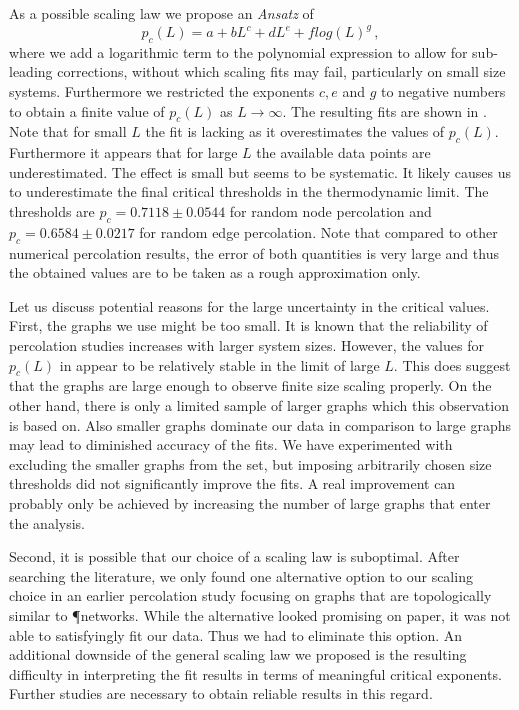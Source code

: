 		As a possible scaling law we propose an \textit{Ansatz} of
		\begin{equation}
			p_c(L) = a + b L^{c} + d L^{e} + f log(L)^{g}\,,
		\end{equation}
		where we add a logarithmic term to the polynomial expression to allow for sub-leading corrections, without which scaling fits may fail, particularly on small size systems. Furthermore we restricted the exponents $c,e$ and $g$ to negative numbers to obtain a finite value of $p_c(L)$ as $L \to \infty$. The resulting fits are shown in . Note that for small $L$ the fit is lacking as it overestimates the values of $p_c(L)$.  Furthermore it appears that for large $L$ the available data points are underestimated. The effect is small but seems to be systematic. It likely causes us to underestimate the final critical thresholds in the thermodynamic limit. The thresholds are $p_c = 0.7118 \pm 0.0544$ for random node percolation and $p_c = 0.6584 \pm 0.0217$ for random edge percolation. Note that compared to other numerical percolation results, the error of both quantities is very large and thus the obtained values are to be taken as a rough approximation only.

		Let us discuss potential reasons for the large uncertainty in the critical values. First, the graphs we use might be too small. It is known that the reliability of percolation studies increases with larger system sizes. However, the values for $p_c(L)$ in  appear to be relatively stable in the limit of large $L$. This does suggest that the graphs are large enough to observe finite size scaling properly. On the other hand, there is only a limited sample of larger graphs which this observation is based on. Also smaller graphs dominate our data in comparison to large graphs may lead to diminished accuracy of the fits. We have experimented with excluding the smaller graphs from the set, but imposing arbitrarily chosen size thresholds did not significantly improve the fits. A real improvement can probably only be achieved by increasing the number of large graphs that enter the analysis.

		Second, it is possible that our choice of a scaling law is suboptimal. After searching the literature, we only found one alternative option to our scaling choice in an earlier percolation study focusing on graphs that are topologically similar to \P networks. While the alternative looked promising on paper, it was not able to satisfyingly fit our data. Thus we had to eliminate this option. An additional downside of the general scaling law we proposed is the resulting difficulty in interpreting the fit results in terms of meaningful critical exponents. Further studies are necessary to obtain reliable results in this regard.

